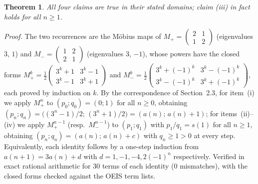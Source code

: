 \documentclass[11pt]{article}
\newtheorem{theorem}{Theorem}[section]
\begin{document}
\begin{theorem}
All four claims are true in their stated domains; claim (iii) in
fact holds for all $n \ge 1$.
\end{theorem}

\emph{Proof.} The two recurrences are the M\"obius maps of
$M_+ = \begin{pmatrix} 2 & 1 \\ 1 & 2 \end{pmatrix}$ (eigenvalues
$3$, $1$) and $M_- = \begin{pmatrix} 1 & 2 \\ 2 & 1 \end{pmatrix}$
(eigenvalues $3$, $-1$), whose powers have the closed forms
$M_+^k = \frac{1}{2}\begin{pmatrix} 3^k + 1 & 3^k - 1 \\
3^k - 1 & 3^k + 1 \end{pmatrix}$ and
$M_-^k = \frac{1}{2}\begin{pmatrix} 3^k + (-1)^k &
3^k - (-1)^k \\ 3^k - (-1)^k & 3^k + (-1)^k \end{pmatrix}$, each
proved by induction on $k$. By the correspondence of Section~2.3, for item~(i) we apply $M_+^n$ to $(p_0; q_0) = (0; 1)$ for all $n \ge 0$, obtaining $(p_n; q_n) = \bigl((3^n - 1)/2;\, (3^n + 1)/2\bigr) = (a(n);\, a(n)+1)$; for items~(ii)--(iv) we apply $M_+^{n-1}$ (resp.\ $M_-^{n-1}$) to $(p_1; q_1)$ with $p_1/q_1 = s(1)$ for all $n \ge 1$, obtaining $(p_n; q_n) = (a(n);\, a(n) + c)$ with $q_n \ge 1 > 0$ at every step. Equivalently, each identity follows by a one-step induction from $a(n+1) = 3a(n) + d$ with $d = 1, -1, -4, 2(-1)^n$ respectively. Verified in exact rational
arithmetic for $30$ terms of each identity ($0$ mismatches), with
the closed forms checked against the OEIS term lists.
\end{document}
